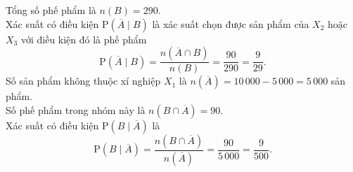 \begin{ex}
{\begin{itemchoice}
			Tổng số phế phẩm là $n(B) = 290$.\\
			Xác suất có điều kiện $\mathrm{P}(\overline{A} \mid B)$ là xác suất chọn được sản phẩm của $X_2$ hoặc $X_3$ với điều kiện đó là phế phẩm
			\[\mathrm{P}(\overline{A} \mid B) = \dfrac{n(\overline{A} \cap B)}{n(B)} = \dfrac{90}{290} = \dfrac{9}{29}.\]
			\itemch Số sản phẩm không thuộc xí nghiệp $X_1$ là $n(\overline{A}) = 10\,000 - 5\,000 = 5\,000$ sản phẩm.\\
			Số phế phẩm trong nhóm này là $n(B \cap \overline{A}) = 90$.\\
			Xác suất có điều kiện $\mathrm{P}(B \mid \overline{A})$ là
			\[\mathrm{P}(B \mid \overline{A}) = \dfrac{n(B \cap \overline{A})}{n(\overline{A})} = \dfrac{90}{5\,000} = \dfrac{9}{500}.\]
		\end{itemchoice}
	}
\end{ex}
\caukq
